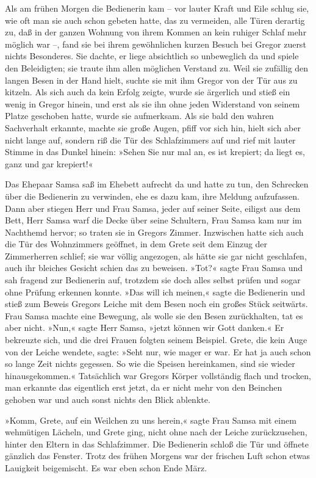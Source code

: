 Als am frühen Morgen die Bedienerin kam -- vor lauter Kraft und Eile
schlug sie, wie oft man sie auch schon gebeten hatte, das zu vermeiden,
alle Türen derartig zu, daß in der ganzen Wohnung von ihrem Kommen an
kein ruhiger Schlaf mehr möglich war --, fand sie bei ihrem gewöhnlichen
kurzen Besuch bei Gregor zuerst nichts Besonderes. Sie dachte, er liege
absichtlich so unbeweglich da und spiele den Beleidigten; sie traute
ihm allen möglichen Verstand zu. Weil sie zufällig den langen Besen in
der Hand hielt, suchte sie mit ihm Gregor von der Tür aus zu kitzeln.
Als sich auch da kein Erfolg zeigte, wurde sie ärgerlich und stieß ein
wenig in Gregor hinein, und erst als sie ihn ohne jeden Widerstand von
seinem Platze geschoben hatte, wurde sie aufmerksam. Als sie bald den
wahren Sachverhalt erkannte, machte sie große Augen, pfiff vor sich hin,
hielt sich aber nicht lange auf, sondern riß die Tür des Schlafzimmers
auf und rief mit lauter Stimme in das Dunkel hinein: »Sehen Sie nur mal
an, es ist krepiert; da liegt es, ganz und gar krepiert!«

Das Ehepaar Samsa saß im Ehebett aufrecht da und hatte zu tun, den
Schrecken über die Bedienerin zu verwinden, ehe es dazu kam, ihre
Meldung aufzufassen. Dann aber stiegen Herr und Frau Samsa, jeder auf
seiner Seite, eiligst aus dem Bett, Herr Samsa warf die Decke über seine
Schultern, Frau Samsa kam nur im Nachthemd hervor; so traten sie in
Gregors Zimmer. Inzwischen hatte sich auch die Tür des Wohnzimmers
geöffnet, in dem Grete seit dem Einzug der Zimmerherren schlief; sie war
völlig angezogen, als hätte sie gar nicht geschlafen, auch ihr bleiches
Gesicht schien das zu beweisen. »Tot?« sagte Frau Samsa und sah fragend
zur Bedienerin auf, trotzdem sie doch alles selbst prüfen und sogar ohne
Prüfung erkennen konnte. »Das will ich meinen,« sagte die Bedienerin und
stieß zum Beweis Gregors Leiche mit dem Besen noch ein großes Stück
seitwärts. Frau Samsa machte eine Bewegung, als wolle sie den Besen
zurückhalten, tat es aber nicht. »Nun,« sagte Herr Samsa, »jetzt können
wir Gott danken.« Er bekreuzte sich, und die drei Frauen folgten seinem
Beispiel. Grete, die kein Auge von der Leiche wendete, sagte: »Seht
nur, wie mager er war. Er hat ja auch schon so lange Zeit nichts
gegessen. So wie die Speisen hereinkamen, sind sie wieder
hinausgekommen.« Tatsächlich war Gregors Körper vollständig flach und
trocken, man erkannte das eigentlich erst jetzt, da er nicht mehr von
den Beinchen gehoben war und auch sonst nichts den Blick ablenkte.

»Komm, Grete, auf ein Weilchen zu uns herein,« sagte Frau Samsa mit
einem wehmütigen Lächeln, und Grete ging, nicht ohne nach der Leiche
zurückzusehen, hinter den Eltern in das Schlafzimmer. Die Bedienerin
schloß die Tür und öffnete gänzlich das Fenster. Trotz des frühen
Morgens war der frischen Luft schon etwas Lauigkeit beigemischt. Es war
eben schon Ende März.

